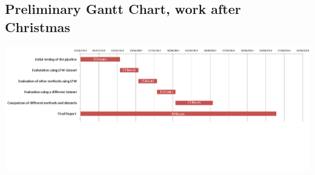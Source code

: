 \documentclass[12pt, a4paper]{article}
\begin{document}
\begin{appendices}
\subsection{Preliminary Gantt Chart, work after Christmas}
\includegraphics[scale=0.4, angle=90]{images/ganntFIRSTpostxmas.png}

        \end{appendices}       
       
       
        \newpage
 
        

\end{document}
